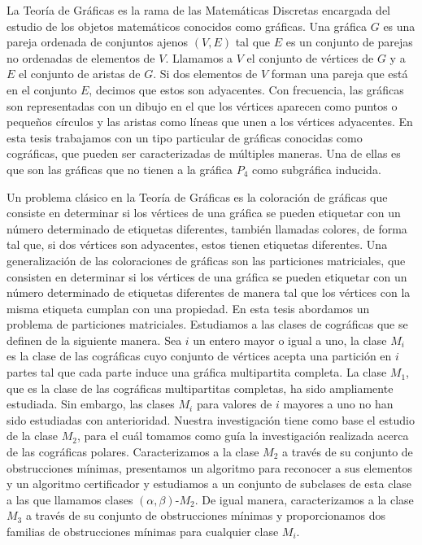 La Teoría de Gráficas es la rama de las Matemáticas Discretas encargada del estudio de los objetos matemáticos conocidos como gráficas. Una gráfica $G$ es una pareja ordenada de conjuntos ajenos $(V,E)$ tal que $E$ es un conjunto de parejas no ordenadas de elementos de $V$. Llamamos a $V$ el conjunto de vértices de $G$ y a $E$ el conjunto de aristas de $G$. Si dos elementos de $V$ forman una pareja que está en el conjunto $E$, decimos que estos son adyacentes. Con frecuencia, las gráficas son representadas con un dibujo en el que los vértices aparecen como puntos o pequeños círculos y las aristas como líneas que unen a los vértices adyacentes. En esta tesis trabajamos con un tipo particular de gráficas conocidas como cográficas, que pueden ser caracterizadas de múltiples maneras. Una de ellas es que son las gráficas que no tienen a la gráfica $P_4$ como subgráfica inducida.

Un problema clásico en la Teoría de Gráficas es la coloración de gráficas que consiste en determinar si los vértices de una gráfica se pueden etiquetar con un número determinado de etiquetas diferentes, también llamadas colores, de forma tal que, si dos vértices son adyacentes, estos tienen etiquetas diferentes. Una generalización de las coloraciones de gráficas son las particiones matriciales, que consisten en determinar si los vértices de una gráfica se pueden etiquetar con un número determinado de etiquetas diferentes de manera tal que los vértices con la misma etiqueta cumplan con una propiedad. En esta tesis abordamos un problema de particiones matriciales. Estudiamos a las clases de cográficas que se definen de la siguiente manera. Sea $i$ un entero mayor o igual a uno, la clase $M_i$ es la clase de las cográficas cuyo conjunto de vértices acepta una partición en $i$ partes tal que cada parte induce una gráfica multipartita completa. La clase $M_1$, que es la clase de las cográficas multipartitas completas, ha sido ampliamente estudiada. Sin embargo, las clases $M_i$ para valores de $i$ mayores a uno no han sido estudiadas con anterioridad. Nuestra investigación tiene como base el estudio de la clase $M_2$, para el cuál tomamos como guía la investigación realizada acerca de las cográficas polares. Caracterizamos a la clase $M_2$ a través de su conjunto de obstrucciones mínimas, presentamos un algoritmo para reconocer a sus elementos y un algoritmo certificador y estudiamos a un conjunto de subclases de esta clase a las que llamamos clases $(\alpha,\beta)$-$M_2$. De igual manera, caracterizamos a la clase $M_3$ a través de su conjunto de obstrucciones mínimas y proporcionamos dos familias de obstrucciones mínimas para cualquier clase $M_i$.